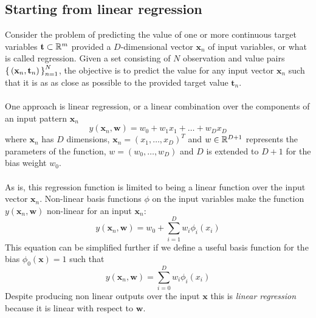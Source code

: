 \subsection{Starting from linear regression}
Consider the problem of predicting the value of one or more continuous target variables 
$\mathbf{t} \subset \mathbb R^m$ provided a $D$-dimensional vector $\mathbf{x}_n$ of input 
variables, or what is called regression. Given a set consisting of $N$ observation and 
value pairs $\set{(\mathbf{x}_{n}, \mathbf{t}_{n})}_{n=1}^N$, the objective is to predict 
the value for any input vector $\mathbf{x}_n$ such that it is as as close as possible 
to the provided target value $\mathbf{t}_n$. 
\\\\
One approach is linear regression, or a linear combination over the components of an input
pattern $\mathbf{x}_n$
\begin{equation} 
    y(\mathbf{x}_n,\mathbf{w}) = w_0 + w_1x_1 + \ldots + w_Dx_D
\end{equation}
where $\mathbf{x}_n$ has $D$ dimensions, $\mathbf{x}_n = (x_1, \ldots, x_D)^T$ and $w \in \mathbb R^{D+1}$ 
represents the parameters of the function, $w = (w_0, \ldots, w_D)$ and $D$ is extended to $D+1$ 
for the bias weight $w_0$. 
\\\\
As is, this regression function is limited to being a linear function over the input vector 
$\mathbf{x}_n$. Non-linear basis functions $\phi$ on the input variables make the function 
$y\left(\mathbf{x}_n, \mathbf{w}\right)$ non-linear for an input $\mathbf{x}_n$:
\begin{equation} 
    y(\mathbf{x}_n,\mathbf{w}) = w_0 + \sum_{i=1}^{D} w_i \phi_i\left(x_i\right)
\end{equation}
This equation can be simplified further if we define a useful basis function for the bias
$\phi_0 (\mathbf{x}) =1$ such that
\begin{equation} 
    y(\mathbf{x}_n,\mathbf{w}) = \sum_{i=0}^{D} w_i \phi_i\left(x_i\right)
\end{equation}
Despite producing non linear outputs over the input $\mathbf{x}$ this is \textit{linear
regression} because it is linear with respect to $\mathbf{w}$.

